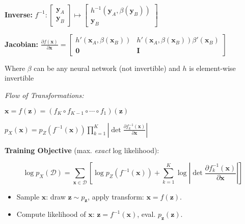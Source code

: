 \textbf{Inverse:} $f^{-1}: \begin{bmatrix} \mathbf{y}_A \\ \mathbf{y}_B \end{bmatrix} \mapsto \begin{bmatrix} h^{-1}(\mathbf{y}_A, \beta(\mathbf{y}_B)) \\ \mathbf{y}_B \end{bmatrix}$

\textbf{Jacobian:} {\footnotesize $\frac{\partial f(\mathbf{x})}{\partial \mathbf{x}} = \begin{bmatrix} h'(\mathbf{x}_A, \beta(\mathbf{x}_B)) & h'(\mathbf{x}_A, \beta(\mathbf{x}_B)) \beta'(\mathbf{x}_B) \\ \mathbf{0} & \mathbf{I} \end{bmatrix}$}

Where $\beta$ can be any neural network (not invertible) and $h$ is element-wise invertible

\emph{Flow of Transformations:}

$\mathbf{x} = f(\mathbf{z}) = (f_K \circ f_{K-1} \circ \cdots \circ f_1)(\mathbf{z})$

$p_X(\mathbf{x}) = p_Z(f^{-1}(\mathbf{x})) \prod_{k=1}^K \left|\det \frac{\partial f_k^{-1}(\mathbf{x})}{\partial \mathbf{x}}\right|$

\textbf{Training Objective} (max. \textit{exact} log likelihood):
\begin{highlightbox*}[gray!30]
\footnotesize
$$\log p_X(\mathcal{D}) = \sum_{\mathbf{x} \in \mathcal{D}} \left[\log p_Z(f^{-1}(\mathbf{x})) + \sum_{k=1}^K \log \left|\det \frac{\partial f_k^{-1}(\mathbf{x})}{\partial \mathbf{x}}\right|\right]$$
\end{highlightbox*}

\begin{itemize}
  \item Sample $\mathbf{x}$: draw $\mathbf{z} \sim p_{\mathbf{z}}$, apply transform: $\mathbf{x} = f(\mathbf{z})$.
  \item Compute likelihood of $\mathbf{x}$: $\mathbf{z} = f^{-1}(\mathbf{x})$, eval. $p_{\mathbf{z}}(\mathbf{z})$.
\end{itemize}



